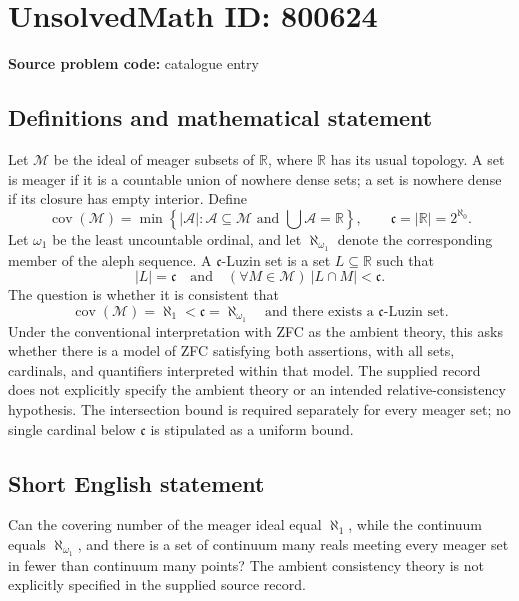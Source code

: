 \documentclass[11pt]{article}
\newcommand{\R}{\mathbb{R}}
\begin{document}
\section*{UnsolvedMath ID: 800624}
\textbf{Source problem code:} catalogue entry
\subsection{Definitions and mathematical statement}
Let \(\mathcal M\) be the ideal of meager subsets of \(\R\), where \(\R\) has its usual topology. A set is meager if it is a countable union of nowhere dense sets; a set is nowhere dense if its closure has empty interior. Define
\[
\operatorname{cov}(\mathcal M)=\min\left\{|\mathcal A|:\mathcal A\subseteq\mathcal M\text{ and }\bigcup\mathcal A=\R\right\},
\qquad \mathfrak c=|\R|=2^{\aleph_0}.
\]
Let \(\omega_1\) be the least uncountable ordinal, and let \(\aleph_{\omega_1}\) denote the corresponding member of the aleph sequence. A \(\mathfrak c\)-Luzin set is a set \(L\subseteq\R\) such that
\[
|L|=\mathfrak c
\quad\text{and}\quad
(\forall M\in\mathcal M)\ |L\cap M|<\mathfrak c.
\]
The question is whether it is consistent that
\[
\operatorname{cov}(\mathcal M)=\aleph_1<\mathfrak c=\aleph_{\omega_1}
\quad\text{and there exists a }\mathfrak c\text{-Luzin set}.
\]
Under the conventional interpretation with ZFC as the ambient theory, this asks whether there is a model of ZFC satisfying both assertions, with all sets, cardinals, and quantifiers interpreted within that model. The supplied record does not explicitly specify the ambient theory or an intended relative-consistency hypothesis. The intersection bound is required separately for every meager set; no single cardinal below \(\mathfrak c\) is stipulated as a uniform bound.
\subsection{Short English statement}
Can the covering number of the meager ideal equal \(\aleph_1\), while the continuum equals \(\aleph_{\omega_1}\), and there is a set of continuum many reals meeting every meager set in fewer than continuum many points? The ambient consistency theory is not explicitly specified in the supplied source record.
\end{document}
